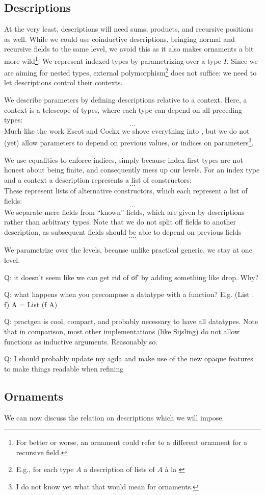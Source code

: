 \subsection{Descriptions}
At the very least, descriptions will need sums, products, and recursive positions as well. While we could use coinductive descriptions, bringing normal and recursive fields to the same level, we avoid this as it also makes ornaments a bit more wild\footnote{For better or worse, an ornament could refer to a different ornament for a recursive field.}. We represent indexed types by parametrizing over a type $I$. Since we are aiming for nested types, external polymorphism\footnote{E.g., for each type $A$ a description of lists of $A$ à la \cite{progorn}} does not suffice: we need to let descriptions control their contexts.

We describe parameters by defining descriptions relative to a context. Here, a context is a telescope of types, where each type can depend on all preceding types:
\[ \dots \]
Much like the work Escot and Cockx \cite{practgen} we shove everything into , but we do not (yet) allow parameters to depend on previous values, or indices on parameters\footnote{I do not know yet what that would mean for ornaments.}.

We use equalities to enforce indices, simply because index-first types are not honest about being finite, and consequently mess up our levels. For an index type and a context a description represents a list of constructors:
\[ \dots \]
These represent lists of alternative constructors, which each represent a list of fields:
\[ \dots \]
We separate mere fields from ``known'' fields, which are given by descriptions rather than arbitrary types. Note that we do not split off fields to another description, as subsequent fields should be able to depend on previous fields
\[ \dots. \]


We parametrize over the levels, because unlike practical generic, we stay at one level.

Q: it doesn't seem like we can get rid of σf′ by adding something like drop. Why?

Q: what happens when you precompose a datatype with a function? E.g. (List . f) A = List (f A) 

Q: practgen is cool, compact, and probably necessary to have all datatypes. Note that in comparison, most other implementations (like Sijsling) do not allow functions as inductive arguments. Reasonably so.

Q: I should probably update my agda and make use of the new opaque features to make things readable when refining

\subsection{Ornaments}
We can now discuss the relation on descriptions which we will impose.


